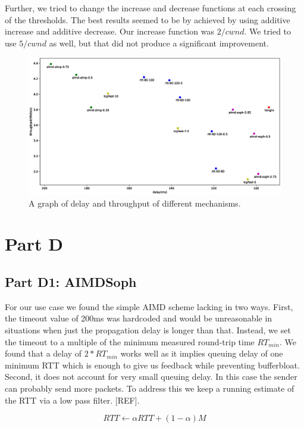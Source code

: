 \documentclass[12pt]{article}
\begin{document}
Further, we tried to change the increase and decrease functions at each crossing
of the thresholds. The best results seemed to be by achieved by using additive
increase and additive decrease. Our increase function was $2/cwnd$. We tried to
use $5/cwnd$ as well, but that did not produce a significant improvement.

\begin{figure}[h]
 \includegraphics[width=\textwidth,height=\textheight,keepaspectratio]{figure_1.eps}
 \caption{A graph of delay and throughput of different mechanisms.}
 \label{fig:all}
\end{figure}

\section*{Part D}

\subsection*{Part D1: AIMDSoph}

For our use case we found the simple AIMD scheme lacking in two ways. First, the
timeout value of 200ms was hardcoded and would be unreasonable in situations
when just the propagation delay is longer than that. Instead, we set the timeout
to a multiple of the minimum measured round-trip time $RT_{min}$. We found that
a delay of $2*RT_{min}$ works well as it implies queuing delay of one minimum
RTT which is enough to give us feedback while preventing bufferbloat. Second, it
does not account for very small queuing delay. In this case the sender can
probably send more packets. To address this we keep a running estimate of the
RTT via a low pass filter. [REF]. 

$${RTT} \leftarrow \alpha {RTT} + \left(1 - \alpha\right)M$$
\end{document}
